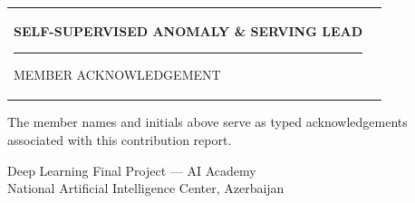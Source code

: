 \documentclass[10pt,a4paper]{article}
\begin{document}
\begin{tabularx}{\textwidth}{
    >{\centering\arraybackslash}X
    >{\centering\arraybackslash}X
}
\begin{minipage}[t]{0.43\textwidth}
\vspace{2pt}

{\footnotesize\bfseries\color{darkgreen}
SELF-SUPERVISED ANOMALY \& SERVING LEAD}

\vspace{9pt}

{\color{darkgreen}
\rule{0.70\linewidth}{0.7pt}}

\vspace{2pt}

{\scriptsize\color{signaturegray}
MEMBER ACKNOWLEDGEMENT}

\end{minipage}

\end{tabularx}

\vspace{10pt}


\begin{center}

\begin{minipage}{0.82\textwidth}

\centering
\footnotesize
\color{signaturegray}

The member names and initials above serve as typed acknowledgements
associated with this contribution report.

\end{minipage}

\end{center}

\vfill


\begin{center}

\small
Deep Learning Final Project --- AI Academy\\
National Artificial Intelligence Center, Azerbaijan

\end{center}
\end{document}
